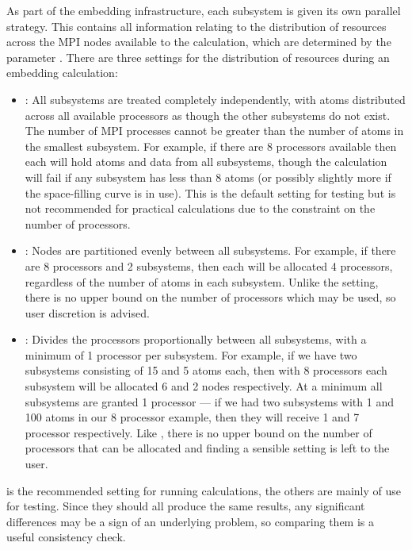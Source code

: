 \documentclass[letterpaper,10pt,english]{sphinxmanual}
\begin{document}
As part of the embedding infrastructure, each subsystem is given its own
parallel strategy. This contains all information relating to the
distribution of resources across the MPI nodes available to the
calculation, which are determined by the parameter .
There are three settings for the distribution of resources during an
embedding calculation:
\begin{itemize}
\item {} 
: All subsystems are treated completely independently, with
atoms distributed across all available processors as though the other
subsystems do not exist. The number of MPI processes cannot be
greater than the number of atoms in the smallest subsystem. For
example, if there are 8 processors available then each will hold
atoms and data from all subsystems, though the calculation will fail
if any subsystem has less than 8 atoms (or possibly slightly more if
the space-filling curve is in use). This is the default setting for
testing but is not recommended for practical calculations due to the
constraint on the number of processors.

\item {} 
: Nodes are partitioned evenly between all subsystems. For
example, if there are 8 processors and 2 subsystems, then each will
be allocated 4 processors, regardless of the number of atoms in each
subsystem. Unlike the  setting, there is no upper bound on
the number of processors which may be used, so user discretion is
advised.

\item {} 
: Divides the processors proportionally between all
subsystems, with a minimum of 1 processor per subsystem. For example,
if we have two subsystems consisting of 15 and 5 atoms each, then
with 8 processors each subsystem will be allocated 6 and 2 nodes
respectively. At a minimum all subsystems are granted 1 processor —
if we had two subsystems with 1 and 100 atoms in our 8 processor
example, then they will receive 1 and 7 processor respectively. Like
, there is no upper bound on the number of processors that
can be allocated and finding a sensible setting is left to the user.

\end{itemize}

 is the recommended setting for running calculations, the
others are mainly of use for testing. Since they should all produce the
same results, any significant differences may be a sign of an underlying
problem, so comparing them is a useful consistency check.
\end{document}
